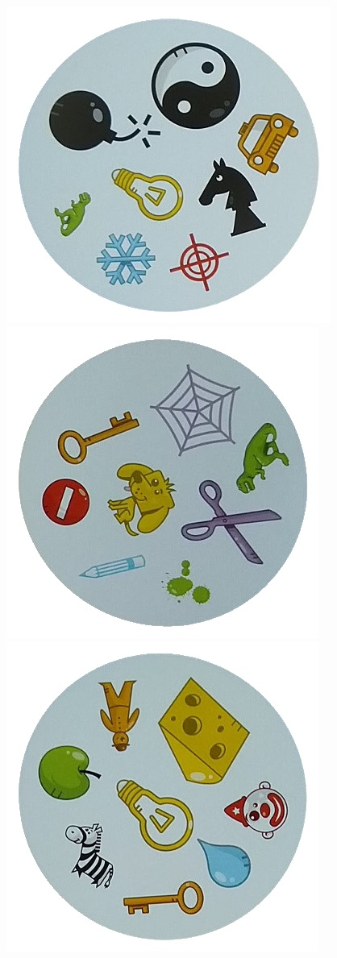 \documentclass[10pt,a4paper]{article}
\begin{document}
\begin{center}
\includegraphics[scale=0.25]{2.1/card3.jpg}
\includegraphics[scale=0.25]{2.1/card4.jpg}
\includegraphics[scale=0.25]{2.1/card5.jpg}
\end{center}
\end{document}
